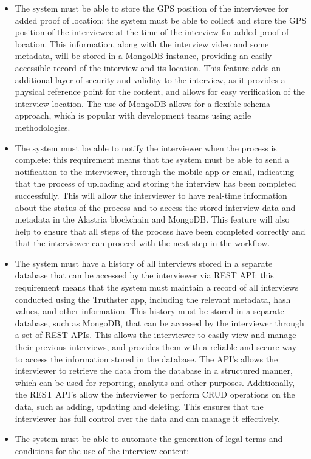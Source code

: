 \documentclass[target=mst,aauheader=]{thud}
\begin{document}
\begin{itemize}
    \item The system must be able to store the GPS position of the interviewee for added proof of location:
    the system must be able to collect and store the GPS position of the interviewee at the time of the interview for added proof of location. This information, along with the interview video and some metadata, will be stored in a MongoDB instance, providing an easily accessible record of the interview and its location. This feature adds an additional layer of security and validity to the interview, as it provides a physical reference point for the content, and allows for easy verification of the interview location. The use of MongoDB allows for a flexible schema approach, which is popular with development teams using agile methodologies.
    \item The system must be able to notify the interviewer when the process is complete:
    this requirement means that the system must be able to send a notification to the interviewer, through the mobile app or email, indicating that the process of uploading and storing the interview has been completed successfully. This will allow the interviewer to have real-time information about the status of the process and to access the stored interview data and metadata in the Alastria blockchain and MongoDB. This feature will also help to ensure that all steps of the process have been completed correctly and that the interviewer can proceed with the next step in the workflow.
    \item The system must have a history of all interviews stored in a separate database that can be accessed by the interviewer via REST API:
    this requirement means that the system must maintain a record of all interviews conducted using the Truthster app, including the relevant metadata, hash values, and other information. This history must be stored in a separate database, such as MongoDB, that can be accessed by the interviewer through a set of REST APIs. This allows the interviewer to easily view and manage their previous interviews, and provides them with a reliable and secure way to access the information stored in the database. The API's allows the interviewer to retrieve the data from the database in a structured manner, which can be used for reporting, analysis and other purposes. Additionally, the REST API's allow the interviewer to perform CRUD operations on the data, such as adding, updating and deleting. This ensures that the interviewer has full control over the data and can manage it effectively.
    \item The system must be able to automate the generation of legal terms and conditions for the use of the interview content:

\end{itemize}
\end{document}
